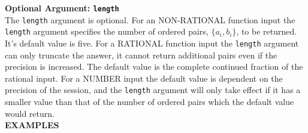 \textbf{Optional Argument: \texttt{length}}\\
%
The \texttt{length} argument is optional. 
For an NON-RATIONAL function input the \texttt{length} argument specifies
the number of ordered pairs, $\{a_i,b_i\}$, to be 
returned. It's default value is five.
For a RATIONAL function input the
\texttt{length} argument can only truncate the answer, it cannot
return additional pairs even if the precision is increased.
The default value is the complete continued fraction of the
rational input. For a NUMBER input the default value is 
dependent on the precision of the session, and the
\texttt{length} argument will only take effect if it has a smaller
value than that of the number of ordered pairs which the default
value would return.\\[\baselineskip]
%
%
%
\large{\textbf{EXAMPLES}}
